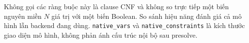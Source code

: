 Không gọi các ràng buộc này là clause CNF và không so trực tiếp một biến nguyên miền $N$ giá trị với một biến Boolean. So sánh hiệu năng đánh giá cả mô hình lẫn backend đang dùng. \texttt{native\_vars} và \texttt{native\_constraints} là kích thước giao diện mô hình, không phản ánh cấu trúc nội bộ sau presolve.
